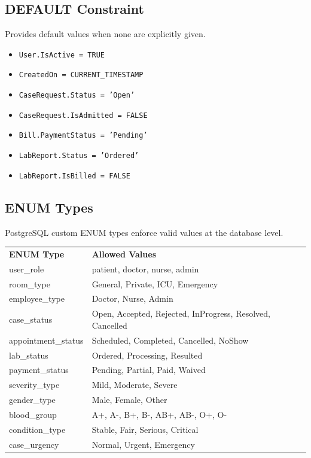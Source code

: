 \documentclass{article}
\newcommand{\theadcell}{\color{white}\bfseries}
\begin{document}
\subsection{DEFAULT Constraint}
Provides default values when none are explicitly given.
\begin{itemize}[leftmargin=1.5cm]
  \item \texttt{User.IsActive = TRUE}
  \item \texttt{CreatedOn = CURRENT\_TIMESTAMP}
  \item \texttt{CaseRequest.Status = 'Open'}
  \item \texttt{CaseRequest.IsAdmitted = FALSE}
  \item \texttt{Bill.PaymentStatus = 'Pending'}
  \item \texttt{LabReport.Status = 'Ordered'}
  \item \texttt{LabReport.IsBilled = FALSE}
\end{itemize}

\subsection{ENUM Types}
PostgreSQL custom ENUM types enforce valid values at the database level.

\begin{center}
\begin{tabular}{L{4cm} L{9cm}}
   \theadcell ENUM Type & \theadcell Allowed Values \\
   user\_role          & patient, doctor, nurse, admin \\
   room\_type          & General, Private, ICU, Emergency \\
   employee\_type      & Doctor, Nurse, Admin \\
   case\_status        & Open, Accepted, Rejected, InProgress, Resolved, Cancelled \\
   appointment\_status & Scheduled, Completed, Cancelled, NoShow \\
   lab\_status         & Ordered, Processing, Resulted \\
   payment\_status     & Pending, Partial, Paid, Waived \\
   severity\_type      & Mild, Moderate, Severe \\
   gender\_type        & Male, Female, Other \\
   blood\_group        & A+, A-, B+, B-, AB+, AB-, O+, O- \\
   condition\_type    & Stable, Fair, Serious, Critical \\
   case\_urgency      & Normal, Urgent, Emergency \\
\end{tabular}
\end{center}
\end{document}
